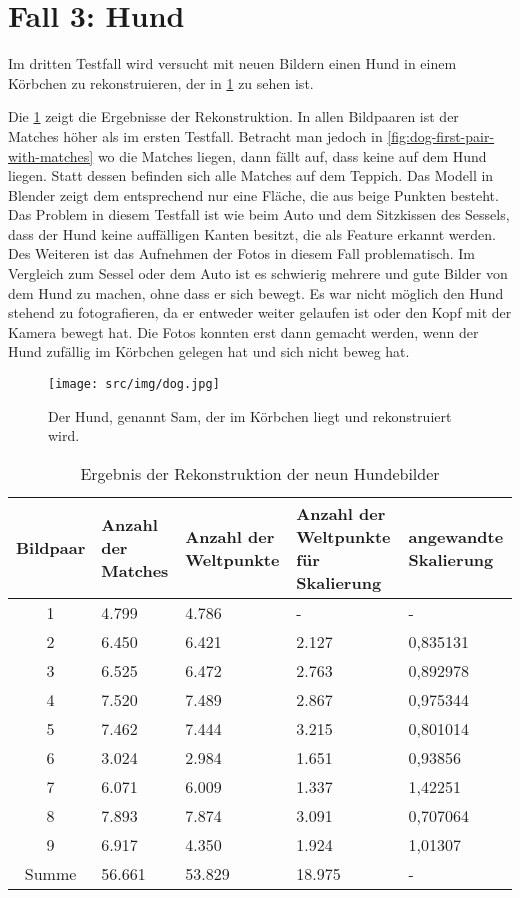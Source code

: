 \section{Fall 3: Hund}
\label{sec:testcase-dog}
Im dritten Testfall wird versucht mit neuen Bildern einen Hund in einem Körbchen zu rekonstruieren, der in \cref{fig:dog-image} zu sehen ist.

Die \cref{tab:dog-results} zeigt die Ergebnisse der Rekonstruktion.
In allen Bildpaaren ist der Matches höher als im ersten Testfall.
Betracht man jedoch in \cref{fig:dog-first-pair-with-matches} wo die Matches liegen, dann fällt auf, dass keine auf dem Hund liegen.
Statt dessen befinden sich alle Matches auf dem Teppich.
Das Modell in Blender zeigt dem entsprechend nur eine Fläche, die aus beige Punkten besteht.
Das Problem in diesem Testfall ist wie beim Auto und dem Sitzkissen des Sessels, dass der Hund keine auffälligen Kanten besitzt, die als Feature erkannt werden.
Des Weiteren ist das Aufnehmen der Fotos in diesem Fall problematisch. 
Im Vergleich zum Sessel oder dem Auto ist es schwierig mehrere und gute Bilder von dem Hund zu machen, ohne dass er sich bewegt. 
Es war nicht möglich den Hund stehend zu fotografieren, da er entweder weiter gelaufen ist oder den Kopf mit der Kamera bewegt hat.
Die Fotos konnten erst dann gemacht werden, wenn der Hund zufällig im Körbchen gelegen hat und sich nicht beweg hat.

\begin{figure}
    \texttt{[image: src/img/dog.jpg]}
    \caption{Der Hund, genannt Sam, der im Körbchen liegt und rekonstruiert wird.}
    \label{fig:dog-image}
\end{figure}

\begin{table}
    \begin{tabularx}{\textwidth}{cXXXX}
        \toprule
        Bildpaar &  Anzahl der Matches & Anzahl der Weltpunkte & Anzahl der Weltpunkte für Skalierung & angewandte Skalierung \\ 
        \midrule
        1 & 4.799 & 4.786 & -  & - \\
        2 & 6.450 & 6.421 & 2.127 & 0,835131 \\
        3 & 6.525 & 6.472 & 2.763 & 0,892978 \\
        4 & 7.520 & 7.489 & 2.867 & 0,975344 \\
        5 & 7.462 & 7.444 & 3.215 & 0,801014 \\
        6 & 3.024 & 2.984 & 1.651 & 0,93856  \\
        7 & 6.071 & 6.009 & 1.337 & 1,42251  \\
        8 & 7.893 & 7.874 & 3.091 & 0,707064 \\
        9 & 6.917 & 4.350 & 1.924 & 1,01307  \\
        \midrule
        Summe & 56.661 & 53.829 & 18.975 & - \\
        \bottomrule
    \end{tabularx}
    \caption{Ergebnis der Rekonstruktion der neun Hundebilder}
    \label{tab:dog-results}
\end{table}

